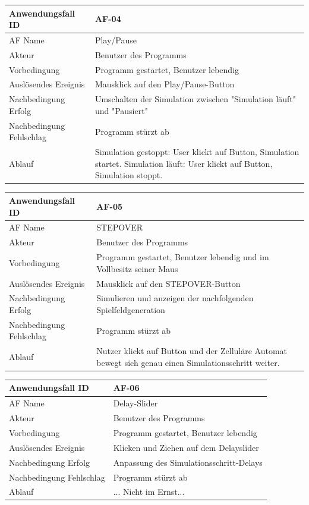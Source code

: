 \documentclass[11pt]{article}
\begin{document}
\begin{tabular}[m]{|m{7cm}|m{9cm}|}
    \hline
    Anwendungsfall ID     & AF-04 \\
         \hline
    AF Name     &  Play/Pause \\
         \hline
    Akteur&Benutzer des Programms \\
    \hline
    Vorbedingung&Programm gestartet, Benutzer lebendig\\
    \hline
    Auslösendes Ereignis&Mausklick auf den Play/Pause-Button\\
    \hline
    Nachbedingung Erfolg&Umschalten der Simulation zwischen "Simulation läuft" und "Pausiert"\\
    \hline
    Nachbedingung Fehlschlag&Programm stürzt ab\\
    \hline
    Ablauf&Simulation gestoppt: User klickt auf Button, Simulation startet. Simulation läuft: User klickt auf Button, Simulation stoppt.\\
    \hline
\end{tabular}
\par


\begin{tabular}[m]{|m{7cm}|m{9cm}|}
    \hline
    Anwendungsfall ID     & AF-05 \\
         \hline
    AF Name     &  STEPOVER \\
         \hline
    Akteur&Benutzer des Programms \\
    \hline
    Vorbedingung&Programm gestartet, Benutzer lebendig und im Vollbesitz seiner Maus\\
    \hline
    Auslösendes Ereignis&Mausklick auf den STEPOVER-Button\\
    \hline
    Nachbedingung Erfolg& Simulieren und anzeigen der nachfolgenden Spielfeldgeneration\\
    \hline
    Nachbedingung Fehlschlag&Programm stürzt ab\\
    \hline
    Ablauf&Nutzer klickt auf Button und der Zelluläre Automat bewegt sich genau einen Simulationsschritt weiter.\\
    \hline
\end{tabular}
\par


\begin{tabular}[m]{|m{7cm}|m{9cm}|}
    \hline
    Anwendungsfall ID     & AF-06 \\
         \hline
    AF Name     &  Delay-Slider\\
         \hline
    Akteur&Benutzer des Programms \\
    \hline
    Vorbedingung&Programm gestartet, Benutzer lebendig\\
    \hline
    Auslösendes Ereignis&Klicken und Ziehen auf dem Delayslider\\
    \hline
    Nachbedingung Erfolg&Anpassung des Simulationsschritt-Delays\\
    \hline
    Nachbedingung Fehlschlag&Programm stürzt ab\\
    \hline
    Ablauf&... Nicht im Ernst...\\
    \hline
\end{tabular}
\par
\end{document}
